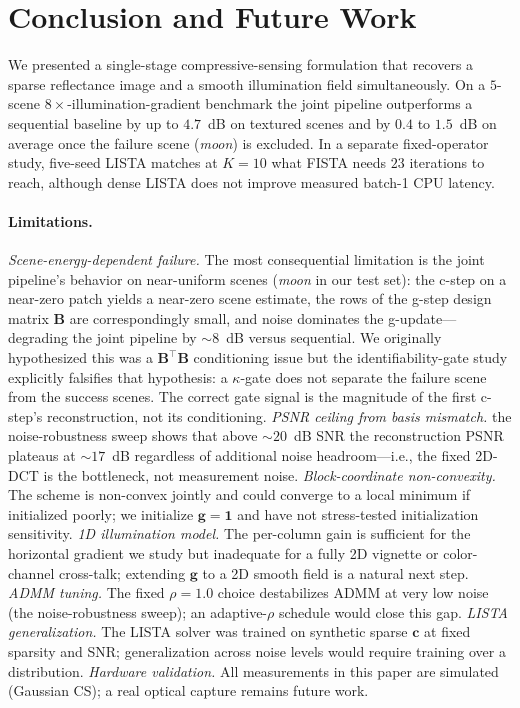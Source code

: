 \documentclass{article}
\begin{document}
\section{Conclusion and Future Work}

We presented a single-stage compressive-sensing formulation that recovers a sparse reflectance image and a smooth illumination field simultaneously. On a $5$-scene $8\times$-illumination-gradient benchmark the joint pipeline outperforms a sequential baseline by up to $4.7$~dB on textured scenes and by $0.4$ to $1.5$~dB on average once the failure scene (\emph{moon}) is excluded. In a separate fixed-operator study, five-seed LISTA matches at $K{=}10$ what FISTA needs $23$ iterations to reach, although dense LISTA does not improve measured batch-1 CPU latency.

\paragraph{Limitations.} \emph{Scene-energy-dependent failure.} The most consequential limitation is the joint pipeline's behavior on near-uniform scenes (\emph{moon} in our test set): the c-step on a near-zero patch yields a near-zero scene estimate, the rows of the g-step design matrix $\boldsymbol{B}$ are correspondingly small, and noise dominates the g-update---degrading the joint pipeline by $\sim 8$~dB versus sequential. We originally hypothesized this was a $\boldsymbol{B}^\top\boldsymbol{B}$ conditioning issue but the identifiability-gate study explicitly falsifies that hypothesis: a $\kappa$-gate does not separate the failure scene from the success scenes. The correct gate signal is the magnitude of the first c-step's reconstruction, not its conditioning. \emph{PSNR ceiling from basis mismatch.} the noise-robustness sweep shows that above $\sim 20$~dB SNR the reconstruction PSNR plateaus at $\sim 17$~dB regardless of additional noise headroom---i.e., the fixed 2D-DCT is the bottleneck, not measurement noise. \emph{Block-coordinate non-convexity.} The scheme is non-convex jointly and could converge to a local minimum if initialized poorly; we initialize $\boldsymbol{g}=\boldsymbol{1}$ and have not stress-tested initialization sensitivity. \emph{1D illumination model.} The per-column gain is sufficient for the horizontal gradient we study but inadequate for a fully 2D vignette or color-channel cross-talk; extending $\boldsymbol{g}$ to a 2D smooth field is a natural next step. \emph{ADMM tuning.} The fixed $\rho{=}1.0$ choice destabilizes ADMM at very low noise (the noise-robustness sweep); an adaptive-$\rho$ schedule would close this gap. \emph{LISTA generalization.} The LISTA solver was trained on synthetic sparse $\boldsymbol{c}$ at fixed sparsity and SNR; generalization across noise levels would require training over a distribution. \emph{Hardware validation.} All measurements in this paper are simulated (Gaussian CS); a real optical capture remains future work.
\end{document}

